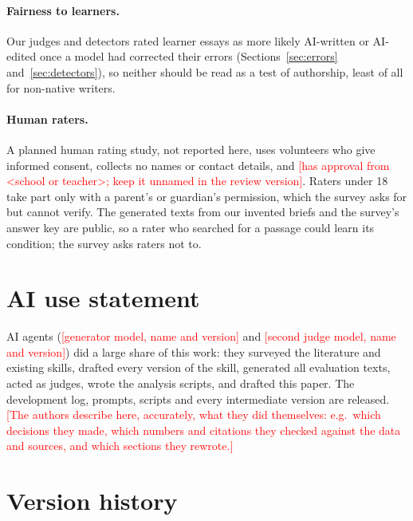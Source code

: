 \documentclass[11pt]{article}
\newcommand{\TBD}[1]{\textcolor{red}{[#1]}}
\newcommand{\genmodel}{\TBD{generator model, name and version}}
\newcommand{\judgemodel}{\TBD{second judge model, name and version}}
\begin{document}
\paragraph{Fairness to learners.} Our judges and detectors rated learner essays as more likely AI-written or AI-edited once a model had corrected their errors (Sections~\ref{sec:errors} and~\ref{sec:detectors}), so neither should be read as a test of authorship, least of all for non-native writers.

\paragraph{Human raters.} A planned human rating study, not reported here, uses volunteers who give informed consent, collects no names or contact details, and \TBD{has approval from <school or teacher>; keep it unnamed in the review version}. Raters under 18 take part only with a parent's or guardian's permission, which the survey asks for but cannot verify. The generated texts from our invented briefs and the survey's answer key are public, so a rater who searched for a passage could learn its condition; the survey asks raters not to.

\section*{AI use statement}

AI agents (\genmodel{} and \judgemodel{}) did a large share of this work: they surveyed the literature and existing skills, drafted every version of the skill, generated all evaluation texts, acted as judges, wrote the analysis scripts, and drafted this paper. The development log, prompts, scripts and every intermediate version are released. \TBD{The authors describe here, accurately, what they did themselves: e.g.\ which decisions they made, which numbers and citations they checked against the data and sources, and which sections they rewrote.}



\appendix

\FloatBarrier
\section{Version history}
\label{sec:appendix-versions}
\end{document}
